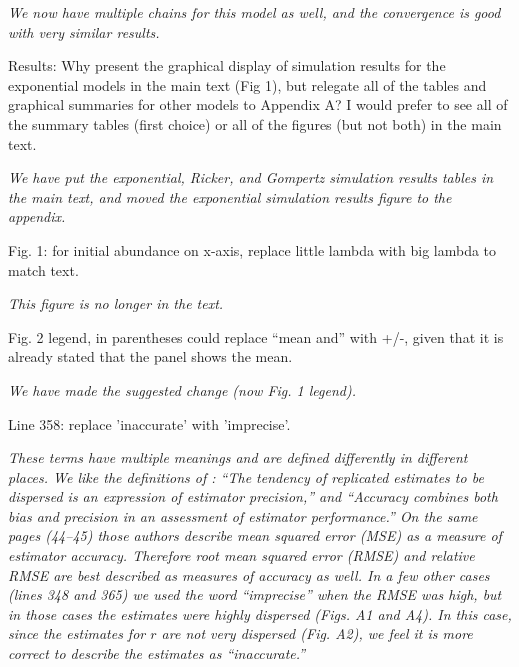 \documentclass[12pt,english]{article}
\begin{document}
\begin{spacing}{1.9}
\begin{flushleft}
\vspace{0.5cm}
\textit{We now have multiple chains for this model as well, and the convergence is good
with very similar results.}
\vspace{0.5cm}

Results: Why present the graphical display of simulation results for the
exponential models in the main text (Fig 1), but relegate all of the tables and
graphical summaries for other models to Appendix A? I would prefer to see all of
the summary tables (first choice) or all of the figures (but not both) in the
main text.

\vspace{0.5cm}
\textit{We have put the exponential, Ricker, and Gompertz simulation results tables in the 
main text, and moved the exponential simulation results figure to the appendix.}
\vspace{0.5cm}

Fig. 1: for initial abundance on x-axis, replace little lambda with big lambda
to match text.

\vspace{0.5cm}
\textit{This figure is no longer in the text.}
\vspace{0.5cm}

Fig. 2 legend, in parentheses could replace ``mean and'' with +/-, given that it
is already stated that the panel shows the mean.

\vspace{0.5cm}
\textit{We have made the suggested change (now Fig. 1 legend).}
\vspace{0.5cm}

Line 358: replace 'inaccurate' with 'imprecise'.

\vspace{0.5cm}
\textit{These terms have multiple meanings and are defined differently in
different places.  We like the definitions of \citet{williams_etal:2002}:
``The tendency of replicated estimates to be dispersed is an expression
of estimator precision,'' and
``Accuracy combines both bias and precision in an assessment of estimator
performance.''  On the same pages (44--45) those authors describe mean squared error 
(MSE) as a measure of estimator accuracy.  Therefore root mean squared error (RMSE) and
relative RMSE are best described as measures of accuracy as well.  
In a few other cases (lines 348 and 365) we used the
word ``imprecise'' when the RMSE was high, but in those cases the estimates were highly dispersed
(Figs. A1 and A4).  In this case, since the estimates for $r$ are not very dispersed (Fig. A2), 
we feel it is more correct to describe
the estimates as ``inaccurate.''}
\vspace{0.5cm}


\end{flushleft}
\end{spacing}
\end{document}

